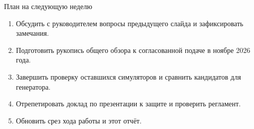 \begin{frame}{План на следующую неделю}
\begin{enumerate}
\item Обсудить с руководителем вопросы предыдущего слайда и зафиксировать замечания.
\item Подготовить рукопись общего обзора к согласованной подаче в ноябре 2026 года.
\item Завершить проверку оставшихся симуляторов и сравнить кандидатов для генератора.
\item Отрепетировать доклад по презентации к защите и проверить регламент.
\item Обновить срез хода работы и этот отчёт.
\end{enumerate}
\end{frame}
